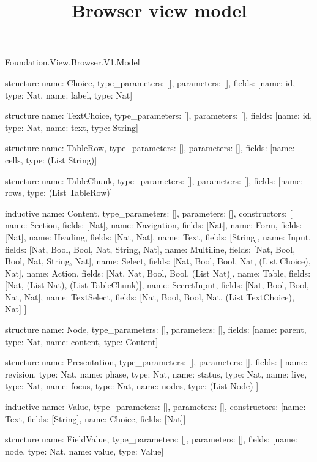 \begin{lexlean}{Foundation.View.Browser.V1.Model}
\title{Browser view model}
\begin{semanticmodule}
structure{
  name: Choice,
  type_parameters: [],
  parameters: [],
  fields: [{name: id, type: Nat}, {name: label, type: Nat}]
}

structure{
  name: TextChoice,
  type_parameters: [],
  parameters: [],
  fields: [{name: id, type: Nat}, {name: text, type: String}]
}

structure{
  name: TableRow,
  type_parameters: [],
  parameters: [],
  fields: [{name: cells, type: (List String)}]
}

structure{
  name: TableChunk,
  type_parameters: [],
  parameters: [],
  fields: [{name: rows, type: (List TableRow)}]
}

inductive{
  name: Content,
  type_parameters: [],
  parameters: [],
  constructors: [
    {name: Section, fields: [Nat]},
    {name: Navigation, fields: [Nat]},
    {name: Form, fields: [Nat]},
    {name: Heading, fields: [Nat, Nat]},
    {name: Text, fields: [String]},
    {name: Input, fields: [Nat, Bool, Bool, Nat, String, Nat]},
    {name: Multiline, fields: [Nat, Bool, Bool, Nat, String, Nat]},
    {name: Select, fields: [Nat, Bool, Bool, Nat, (List Choice), Nat]},
    {name: Action, fields: [Nat, Nat, Bool, Bool, (List Nat)]},
    {name: Table, fields: [Nat, (List Nat), (List TableChunk)]},
    {name: SecretInput, fields: [Nat, Bool, Bool, Nat, Nat]},
    {name: TextSelect, fields: [Nat, Bool, Bool, Nat, (List TextChoice), Nat]}
  ]
}

structure{
  name: Node,
  type_parameters: [],
  parameters: [],
  fields: [{name: parent, type: Nat}, {name: content, type: Content}]
}

structure{
  name: Presentation,
  type_parameters: [],
  parameters: [],
  fields: [
    {name: revision, type: Nat},
    {name: phase, type: Nat},
    {name: status, type: Nat},
    {name: live, type: Nat},
    {name: focus, type: Nat},
    {name: nodes, type: (List Node)}
  ]
}

inductive{
  name: Value,
  type_parameters: [],
  parameters: [],
  constructors: [{name: Text, fields: [String]}, {name: Choice, fields: [Nat]}]
}

structure{
  name: FieldValue,
  type_parameters: [],
  parameters: [],
  fields: [{name: node, type: Nat}, {name: value, type: Value}]
}


\end{semanticmodule}
\end{lexlean}
